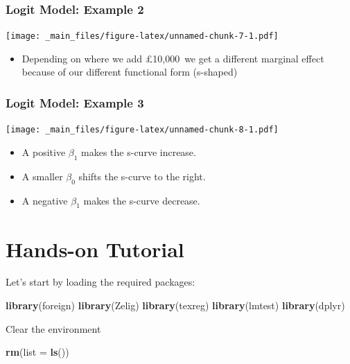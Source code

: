 \documentclass[]{article}
\newenvironment{Shaded}{\begin{snugshade}}{\end{snugshade}}
\newcommand{\KeywordTok}[1]{\textcolor[rgb]{0.13,0.29,0.53}{\textbf{{#1}}}}
\newcommand{\DataTypeTok}[1]{\textcolor[rgb]{0.13,0.29,0.53}{{#1}}}
\newcommand{\NormalTok}[1]{{#1}}
\providecommand{\tightlist}{%
  \setlength{\itemsep}{0pt}\setlength{\parskip}{0pt}}
\theoremstyle{definition}
\theoremstyle{definition}
\theoremstyle{remark}
\begin{document}
\subsubsection{Logit Model: Example 2}\label{logit-model-example-2}

\texttt{[image: \_main\_files/figure-latex/unnamed-chunk-7-1.pdf]}

\begin{itemize}
\tightlist
\item
  Depending on where we add £10,000~we get a different marginal effect
  because of our different functional form (s-shaped)
\end{itemize}

\subsubsection{Logit Model: Example 3}\label{logit-model-example-3}

\texttt{[image: \_main\_files/figure-latex/unnamed-chunk-8-1.pdf]}

\begin{itemize}
\tightlist
\item
  A positive \(\beta_1\) makes the s-curve increase.
\item
  A smaller \(\beta_0\) shifts the s-curve to the right.
\item
  A negative \(\beta_1\) makes the s-curve decrease.
\end{itemize}

\section{Hands-on Tutorial}\label{hands-on-tutorial}

Let's start by loading the required packages:

\begin{Shaded}
\begin{Highlighting}[]
\KeywordTok{library}\NormalTok{(foreign) }
\KeywordTok{library}\NormalTok{(Zelig) }
\KeywordTok{library}\NormalTok{(texreg) }
\KeywordTok{library}\NormalTok{(lmtest)}
\KeywordTok{library}\NormalTok{(dplyr)}
\end{Highlighting}
\end{Shaded}

Clear the environment

\begin{Shaded}
\begin{Highlighting}[]
\KeywordTok{rm}\NormalTok{(}\DataTypeTok{list =} \KeywordTok{ls}\NormalTok{())}
\end{Highlighting}
\end{Shaded}
\end{document}
